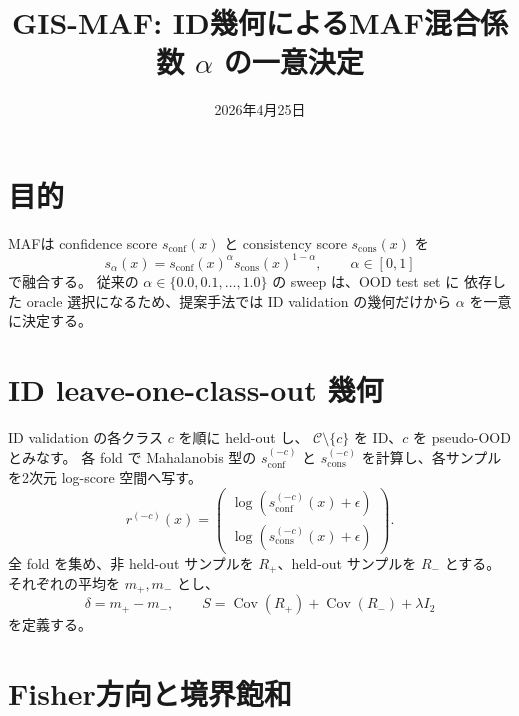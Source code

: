 \documentclass[a4paper,11pt]{ltjsarticle}
\title{GIS-MAF: ID幾何によるMAF混合係数 $\alpha$ の一意決定}
\author{}
\date{2026年4月25日}
\begin{document}
\maketitle

\section{目的}

MAFは confidence score $s_{\mathrm{conf}}(x)$ と consistency score
$s_{\mathrm{cons}}(x)$ を
\begin{equation}
    s_{\alpha}(x)
    =
    s_{\mathrm{conf}}(x)^{\alpha}
    s_{\mathrm{cons}}(x)^{1-\alpha},
    \qquad
    \alpha\in[0,1]
\end{equation}
で融合する。
従来の $\alpha\in\{0.0,0.1,\ldots,1.0\}$ の sweep は、OOD test set に
依存した oracle 選択になるため、提案手法では ID validation の幾何だけから
$\alpha$ を一意に決定する。

\section{ID leave-one-class-out 幾何}

ID validation の各クラス $c$ を順に held-out し、
$\mathcal{C}\setminus\{c\}$ を ID、$c$ を pseudo-OOD とみなす。
各 fold で Mahalanobis 型の $s_{\mathrm{conf}}^{(-c)}$ と
$s_{\mathrm{cons}}^{(-c)}$ を計算し、各サンプルを2次元 log-score 空間へ写す。
\begin{equation}
    r^{(-c)}(x)
    =
    \begin{pmatrix}
        \log(s_{\mathrm{conf}}^{(-c)}(x)+\epsilon)\\
        \log(s_{\mathrm{cons}}^{(-c)}(x)+\epsilon)
    \end{pmatrix}.
\end{equation}
全 fold を集め、非 held-out サンプルを $R_+$、held-out サンプルを $R_-$ とする。
それぞれの平均を $m_+,m_-$ とし、
\begin{equation}
    \delta=m_+-m_-,
    \qquad
    S=\operatorname{Cov}(R_+)+\operatorname{Cov}(R_-)+\lambda I_2
\end{equation}
を定義する。

\section{Fisher方向と境界飽和}
\end{document}
